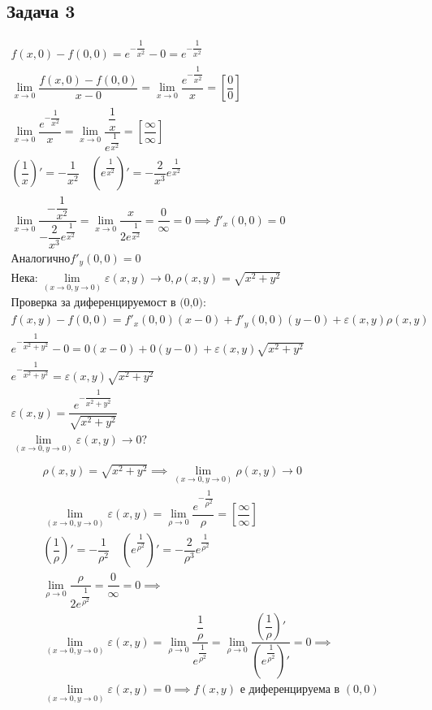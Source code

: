 \documentclass[a4paper,fleqn,12pt]{article}
\theoremstyle{definition}
\begin{document}
\subsection*{Задача 3}
\begin{gather*}
f(x,0) - f(0,0) = e^{- \dfrac{1}{x^2}} - 0 = e^{- \dfrac{1}{x^2}}\\
\lim\limits_{x \to 0} \dfrac{f(x,0) - f(0,0)}{x - 0}= \lim\limits_{x \to 0} \dfrac{e^{- \dfrac{1}{x^2}}}{x} = \left[ \dfrac{0}{0}\right]\\
\lim\limits_{x \to 0} \dfrac{e^{- \dfrac{1}{x^2}}}{x} = \lim\limits_{x \to 0} \dfrac{\dfrac{1}{x}}{e^{\dfrac{1}{x^2}}} = \left[ \dfrac{\infty}{\infty}\right] \\
\left( \dfrac{1}{x} \right)' = -\dfrac{1}{x^2} \quad \left( e^{\dfrac{1}{x^2}} \right)' = -\dfrac{2}{x^3} e^{\dfrac{1}{x^2}}\\
\lim\limits_{x \to 0} \dfrac{-\dfrac{1}{x^2}}{-\dfrac{2}{x^3} e^{\dfrac{1}{x^2}}} = \lim\limits_{x \to 0} \dfrac{x}{2e^{\dfrac{1}{x^2}}} = \dfrac{0}{\infty} = 0 \implies f'_x(0,0) = 0\\
\text{Аналогично} f'_y(0,0) = 0\\
\text{Нека}: \lim\limits_ {(x \to 0, y \to 0)} \varepsilon (x,y) \to 0, \rho (x,y) = \sqrt{x^2 + y^2}\\
\text{Проверка за диференцируемост в (0,0):}\\
f(x,y) - f(0,0)  = f'_x(0,0)(x - 0) + f'_y(0,0)(y-0) + \varepsilon (x,y) \rho (x,y) \\
e^{- \dfrac{1}{x^2 + y^2}} - 0 = 0(x-0) + 0(y-0) + \varepsilon (x,y)\sqrt{x^2 + y^2}\\
e^{- \dfrac{1}{x^2 + y^2}} = \varepsilon (x,y)\sqrt{x^2 + y^2}\\
\varepsilon (x,y) = \dfrac{e^{- \dfrac{1}{x^2 + y^2}}}{\sqrt{x^2 + y^2}}\\
\lim\limits_ {(x \to 0, y \to 0)} \varepsilon (x,y) \to 0?\\
\end{gather*}
\begin{gather*}
\rho (x,y) = \sqrt{x^2 + y^2} \implies \lim\limits_ {(x \to 0, y \to 0)}\rho (x,y) \to 0 \\
\lim\limits_ {(x \to 0, y \to 0)} \varepsilon (x,y) = \lim\limits_ {\rho \to 0} \dfrac{e^{- \dfrac{1}{\rho^2}}}{\rho} = \left[ \dfrac{\infty}{\infty}\right]\\
\left( \dfrac{1}{\rho} \right)' = -\dfrac{1}{\rho^2} \quad \left( e^{\dfrac{1}{\rho^2}} \right)' = -\dfrac{2}{\rho^3} e^{\dfrac{1}{\rho^2}} \\
\lim\limits_ {\rho \to 0} \dfrac{\rho}{2e^{\dfrac{1}{\rho^2}}} = \dfrac{0}{\infty} = 0 \implies \\
\lim\limits_ {(x \to 0, y \to 0)} \varepsilon (x,y) = \lim\limits_ {\rho \to 0} \dfrac{\dfrac{1}{\rho}}{e^{\dfrac{1}{\rho^2}}} = \lim\limits_ {\rho \to 0} \dfrac{\left( \dfrac{1}{\rho} \right)'}{\left( e^{\dfrac{1}{\rho^2}}\right)'} = 0
\implies \\
\lim\limits_ {(x \to 0, y \to 0)} \varepsilon (x,y) = 0 \implies f(x,y) \text{ е диференцируема в } (0,0)
\end{gather*}
\end{document}
